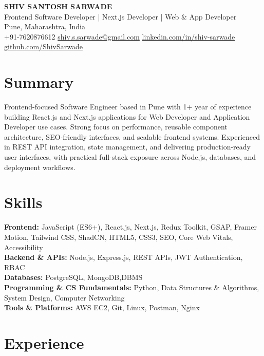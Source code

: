 \documentclass[a4paper,10pt]{article}
\begin{document}
    \pagestyle{empty}

    \begin{center}
        {\LARGE \textbf{SHIV SANTOSH SARWADE}}\\
        Frontend Software Developer | Next.js Developer | Web \& App Developer\\[4pt]
        Pune, Maharashtra, India\\
        +91-7620876612 \quad
        \href{mailto:shiv.s.sarwade@gmail.com}{shiv.s.sarwade@gmail.com} \quad
        \href{https://linkedin.com/in/shiv-sarwade}{linkedin.com/in/shiv-sarwade} \quad
        \href{https://github.com/ShivSarwade}{github.com/ShivSarwade}
    \end{center}

    \section*{Summary}

    Frontend-focused Software Engineer based in Pune with 1+ year of experience building React.js and Next.js applications for Web Developer and Application Developer use cases. Strong focus on performance, reusable component architecture, SEO-friendly interfaces, and scalable frontend systems. Experienced in REST API integration, state management, and delivering production-ready user interfaces, with practical full-stack exposure across Node.js, databases, and deployment workflows.

    \section*{Skills}

    \textbf{Frontend:} JavaScript (ES6+), React.js, Next.js, Redux Toolkit, GSAP, Framer Motion, Tailwind CSS, ShadCN, HTML5, CSS3, SEO, Core Web Vitals, Accessibility\\
    \textbf{Backend \& APIs:} Node.js, Express.js, REST APIs, JWT Authentication, RBAC\\
    \textbf{Databases:} PostgreSQL, MongoDB,DBMS\\
    \textbf{Programming \& CS Fundamentals:} Python, Data Structures \& Algorithms, System Design, Computer Networking\\
    \textbf{Tools \& Platforms:} AWS EC2, Git, Linux, Postman, Nginx

    \section*{Experience}
\end{document}

